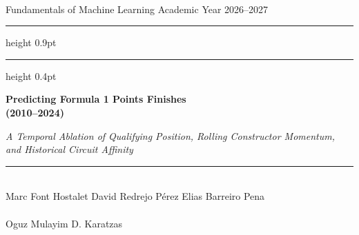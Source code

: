 \documentclass[10pt,a4paper,twocolumn]{article}
\begin{document}
\begin{titlepage}
  \thispagestyle{empty}
  \color{ink}
  \centering

  \vspace*{0.4cm}
  {\normalsize\scshape{}}\\[4pt]
  {\small\color{muted} Fundamentals of Machine Learning \;\textperiodcentered\; Academic Year 2026--2027}\\[3pt]
  {\footnotesize\scshape{}}

  \vspace{0.55cm}
  {\color{ruledark}\hrule height 0.9pt}
  \vspace{2pt}
  {\color{rulelight}\hrule height 0.4pt}

  \vspace{1.8cm}
  {\fontsize{20pt}{24.5pt}\selectfont\bfseries Predicting Formula 1 Points Finishes\\[4pt] (2010--2024)\par}
  \vspace{0.55cm}
  {\fontsize{12pt}{15.5pt}\selectfont\itshape\color{muted}
    A Temporal Ablation of Qualifying Position, Rolling Constructor Momentum,\\
    and Historical Circuit Affinity\par}

  \vspace{1.35cm}
  {\color{rulelight}\rule{0.32\textwidth}{0.5pt}}
  \vspace{1.1cm}

  {\footnotesize\scshape{}}\\[8pt]
  {\large
    Marc Font Hostalet \quad\textperiodcentered\quad
    David Redrejo P\'erez \quad\textperiodcentered\quad
    Elias Barreiro Pena
  }\\[16pt]

  {\footnotesize\scshape{}}\\[5pt]
  {\normalsize Oguz Mulayim \quad\textperiodcentered\quad D. Karatzas}

  \vspace{1.5cm}


\end{titlepage}
\end{document}
